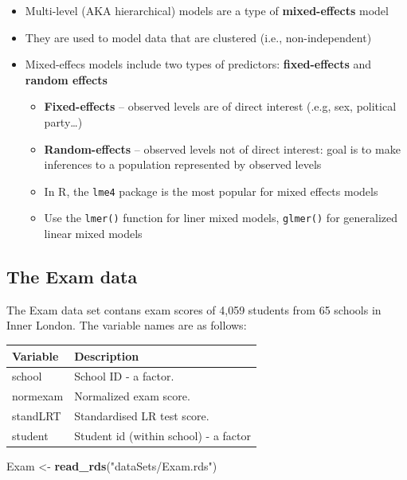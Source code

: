 \documentclass[]{book}
\newenvironment{Shaded}{\begin{snugshade}}{\end{snugshade}}
\newcommand{\KeywordTok}[1]{\textcolor[rgb]{0.13,0.29,0.53}{\textbf{#1}}}
\newcommand{\NormalTok}[1]{#1}
\newcommand{\StringTok}[1]{\textcolor[rgb]{0.31,0.60,0.02}{#1}}
\providecommand{\tightlist}{%
  \setlength{\itemsep}{0pt}\setlength{\parskip}{0pt}}
\begin{document}
\begin{itemize}
\tightlist
\item
  Multi-level (AKA hierarchical) models are a type of \textbf{mixed-effects} model
\item
  They are used to model data that are clustered (i.e., non-independent)
\item
  Mixed-effecs models include two types of predictors: \textbf{fixed-effects} and \textbf{random effects}

  \begin{itemize}
  \tightlist
  \item
    \textbf{Fixed-effects} -- observed levels are of direct interest (.e.g, sex, political party\ldots{})
  \item
    \textbf{Random-effects} -- observed levels not of direct interest: goal is to make inferences to a population represented by observed levels
  \item
    In R, the \texttt{lme4} package is the most popular for mixed effects models
  \item
    Use the \texttt{lmer()} function for liner mixed models, \texttt{glmer()} for generalized linear mixed models
  \end{itemize}
\end{itemize}

\hypertarget{the-exam-data}{%
\subsection{The Exam data}\label{the-exam-data}}

The Exam data set contans exam scores of 4,059 students from 65 schools in Inner London. The variable names are as follows:

\begin{longtable}[]{@{}ll@{}}
\toprule
Variable & Description\tabularnewline
\midrule
\endhead
school & School ID - a factor.\tabularnewline
normexam & Normalized exam score.\tabularnewline
standLRT & Standardised LR test score.\tabularnewline
student & Student id (within school) - a factor\tabularnewline
\bottomrule
\end{longtable}

\begin{Shaded}
\begin{Highlighting}[]
\NormalTok{  Exam <-}\StringTok{ }\KeywordTok{read_rds}\NormalTok{(}\StringTok{"dataSets/Exam.rds"}\NormalTok{)}
\end{Highlighting}
\end{Shaded}
\end{document}

